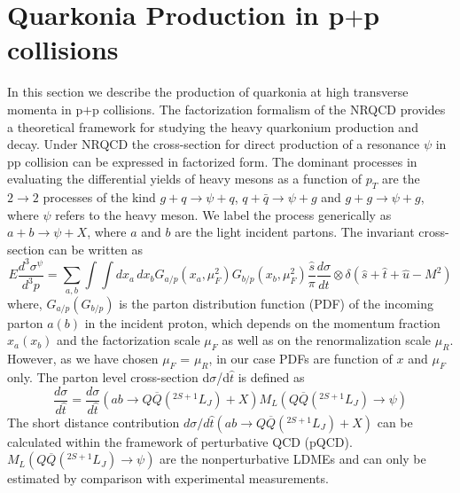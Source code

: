 \documentclass[aps,prc,preprint,superscriptaddress,showpacs,showkeys,amsmath]{revtex4-1}
\begin{document}
\section{Quarkonia Production in p$+$p collisions}
\label{section:ppProduction}
In this section we describe the production of quarkonia at high transverse
momenta in p$+$p collisions. The factorization formalism of the NRQCD  provides 
a theoretical framework for studying the heavy quarkonium production and decay.
Under NRQCD the cross-section for direct production of a resonance $\psi$ in pp collision 
can be expressed in factorized form. The dominant processes in evaluating the differential 
yields of heavy mesons as a function of $p_T$ are the $2\rightarrow 2$
processes of the kind $g+q\rightarrow \psi+q$, $q+\bar{q}\rightarrow \psi+g$ and
$g+g\rightarrow \psi+g$, where $\psi$ refers to the heavy meson. We label the process
generically as $a+b\rightarrow \psi+X$, where $a$ and $b$ are the light incident
partons. The invariant cross-section can be written as 
\begin{equation}
    E\frac{d^{3}\sigma^{\psi}}{d^{3}p} = \sum_{a,b}\int \int dx_a\,dx_b 
    G_{a/p}(x_a,\mu_{F}^{2}) G_{b/p}(x_b,\mu_{F}^{2})\frac{\hat s}{\pi}\frac{d\sigma}{d\hat t}
    \otimes \delta(\hat s + \hat t + \hat u -M^{2}) 
\label{eqn:cross}
\end{equation}
where, $G_{a/p}(G_{b/p})$ is the parton distribution function (PDF) of the incoming parton $a(b)$ in the 
incident proton, which depends on the momentum fraction $x_a(x_b)$ and the factorization 
scale $\mu_F$ as well as on the renormalization scale $\mu_R$. However, 
as we have chosen $\mu_F$ = $\mu_R$, in our case PDFs are function of $x$ and $\mu_F$ only. 
The parton level cross-section d$\sigma$/d$\hat{t}$ is defined as
\begin{equation}
\frac{d\sigma}{d\hat t} = \frac{d\sigma}{d\hat t}(ab\rightarrow Q\overline{Q}(^{2S+1}L_{J})+X)M_{L}(Q\overline{Q}(^{2S+1}L_{J})\rightarrow\psi)
\end{equation}
The short distance contribution $d\sigma/d\hat t (ab\rightarrow Q\overline{Q}(^{2S+1}L_{J})+X)$ can be calculated within 
the framework of perturbative QCD (pQCD). $M_{L}(Q\overline{Q}(^{2S+1}L_{J})\rightarrow\psi)$ are the nonperturbative 
LDMEs and can only be estimated by comparison with experimental measurements. 
\end{document}
